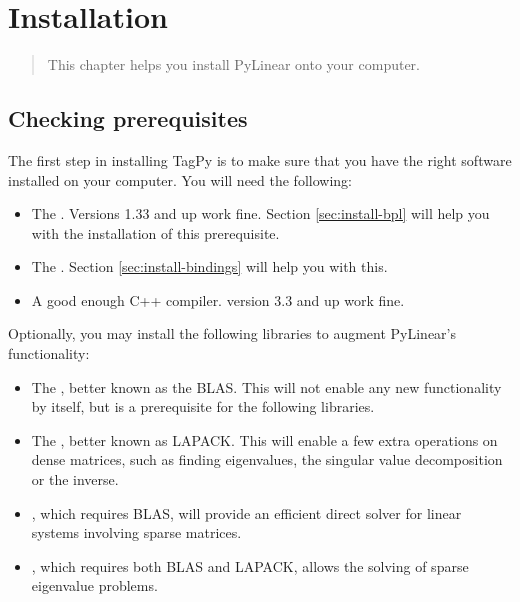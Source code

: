 \chapter{Installation}
\label{cha:installation}

\begin{quote}
   This chapter helps you install PyLinear onto your computer.
\end{quote}

\section{Checking prerequisites}

The first step in installing TagPy is to make sure that you have the
right software installed on your computer. You will need the
following:

\begin{itemize}
  \item The . 
    Versions 1.33 and up work fine. Section \ref{sec:install-bpl}
    will help you with the installation of this prerequisite.
  \item The
    . Section \ref{sec:install-bindings} will
    help you with this.
  \item A good enough C++ compiler. 
    version 3.3 and up work fine.
\end{itemize}

Optionally, you may install the following libraries to augment
PyLinear's functionality:

\begin{itemize}
  \item The , better known as the BLAS. This will
    not enable any new functionality by itself, but is a
    prerequisite for the following libraries.
  \item The , better known as LAPACK. This will enable a few
    extra operations on dense matrices, such as finding eigenvalues,
    the singular value decomposition or the inverse.
  \item {},
    which requires BLAS, will provide an efficient direct solver
    for linear systems involving sparse matrices.
  \item {},
    which requires both BLAS and LAPACK, allows the solving of
    sparse eigenvalue problems.
\end{itemize}

